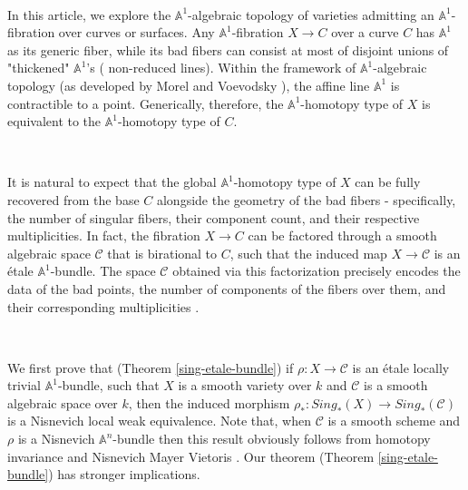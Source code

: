 \documentclass[11pt, reqno]{amsart}
\theoremstyle{plain}
\theoremstyle{definition}
\begin{document}
\


In this article, we explore the $\mathbb{A}^1$-algebraic topology of varieties admitting an $\mathbb{A}^1$-fibration over curves or surfaces. Any $\mathbb{A}^1$-fibration $X \to C$ over a curve $C$ has $\mathbb{A}^1$ as its generic fiber, while its bad fibers can consist at most of disjoint unions of "thickened" $\mathbb{A}^1$'s ( non-reduced lines). Within the framework of 
$\mathbb{A}^1$-algebraic topology (as developed by Morel and Voevodsky \cite{mv}), the affine line $\mathbb{A}^1$ is contractible to a point. Generically, therefore, the $\mathbb{A}^1$-homotopy type of $X$ is equivalent to the $\mathbb{A}^1$-homotopy type of $C$. 

\

It is natural to expect that the global $\mathbb{A}^1$-homotopy type of $X$ can be fully recovered from the base $C$ alongside the geometry of the bad fibers - specifically, the number of singular fibers, their component count, and their respective multiplicities. In fact, the fibration $X \to C$ can be factored through a smooth algebraic space $\mathcal{C}$ that is birational to $C$, such that the induced map $X \to \mathcal{C}$ is an étale $\mathbb{A}^1$-bundle. The space $\mathcal{C}$ obtained via this factorization precisely encodes the data of the bad points, the number of components of the fibers over them, and their corresponding multiplicities \cite{doub}. 









\


We first prove that (Theorem \ref{sing-etale-bundle}) if   $\rho: X \to \mathcal{C}$ is an étale locally trivial $\mathbb{A}^1$-bundle, such that $X$ is a smooth variety over $k$ and $\mathcal{C}$ is a smooth algebraic space over $k$, then the induced morphism $\rho_*: Sing_*(X) \to Sing_*(\mathcal{C})$ is a Nisnevich local weak equivalence. Note that, when $\mathcal{C}$ is a smooth scheme and $\rho$ is a Nisnevich $\mathbb{A}^n$-bundle then this result obviously follows from homotopy invariance and Nisnevich Mayer Vietoris \cite{krishnakumar}.
Our theorem (Theorem \ref{sing-etale-bundle}) has stronger implications.

\
\end{document}
